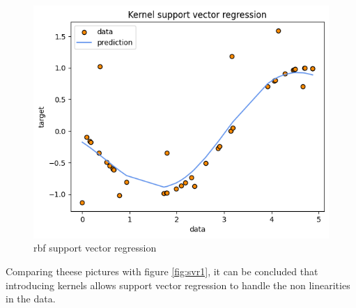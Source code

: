 \begin{figure}
    \includegraphics[width=\textwidth]{images/svr3.png}
    \caption{rbf support vector regression}
    \label{fig:svr3}
\end{figure}
Comparing theese pictures with figure \ref{fig:svr1}, it can be concluded that introducing kernels allows support vector regression to handle the non linearities in the data.
